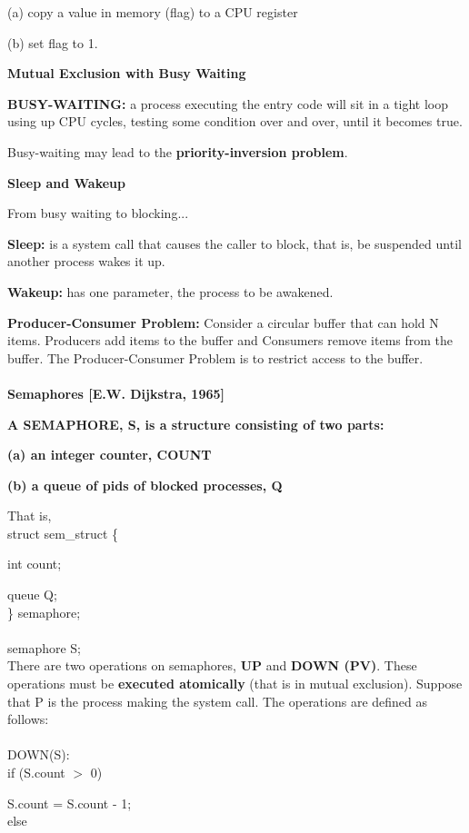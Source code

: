 \documentclass[]{report}
\begin{document}
(a) copy a value in memory (flag) to a CPU register

(b) set flag to 1.

\textbf{Mutual Exclusion with Busy Waiting}

\textbf{BUSY-WAITING: }a process executing the entry
code will sit in a tight loop using up CPU cycles,
testing some condition over and over, until it
becomes true.

Busy-waiting may lead to the \textbf{priority-inversion
problem}.

\textbf{Sleep and Wakeup}

From busy waiting to blocking...

\textbf{Sleep:} is a system call that causes the caller to
block, that is, be suspended until another process
wakes it up.

\textbf{Wakeup:} has one parameter, the process to be
awakened.

\textbf{Producer-Consumer Problem: }Consider a circular buffer that
can hold N items. Producers add items to the buffer and Consumers
remove items from the buffer. The Producer-Consumer Problem is to
restrict access to the buffer.\\\\
\textbf{Semaphores [E.W. Dijkstra, 1965]}

\textbf{A SEMAPHORE, S, is a structure consisting of two
parts:}

\textbf{(a) an integer counter, COUNT}

\textbf{(b) a queue of pids of blocked processes, Q}

That is,\\
struct sem\_struct \{

	int count;
	
	queue Q;\\
\} semaphore;\\\\
semaphore S;\\

There are two operations on semaphores, \textbf{UP} and
\textbf{DOWN (PV)}. These operations must be \textbf{executed
atomically} (that is in mutual exclusion). Suppose that
P is the process making the system call. The
operations are defined as follows:\\\\
DOWN(S):\\
if (S.count $>$ 0)

S.count = S.count - 1;\\
else
\end{document}
